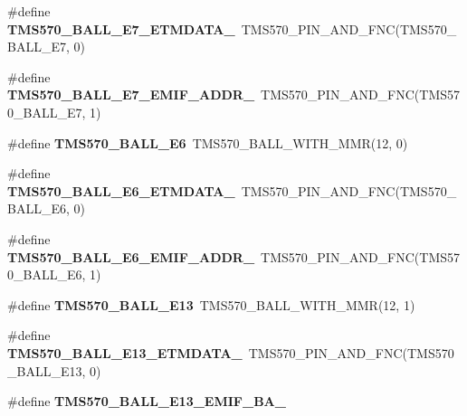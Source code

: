 \begin{DoxyCompactItemize}
\#define {\bfseries T\+M\+S570\+\_\+\+B\+A\+L\+L\+\_\+\+E7\+\_\+\+E\+T\+M\+D\+A\+T\+A\+\_}~T\+M\+S570\+\_\+\+P\+I\+N\+\_\+\+A\+N\+D\+\_\+\+F\+NC(T\+M\+S570\+\_\+\+B\+A\+L\+L\+\_\+\+E7, 0)
\item 
\mbox{\label{tms570lc4357-pins_8h_abb9cbc6f03a0fc7743dd2a638ba13be2}} 
\#define {\bfseries T\+M\+S570\+\_\+\+B\+A\+L\+L\+\_\+\+E7\+\_\+\+E\+M\+I\+F\+\_\+\+A\+D\+D\+R\+\_}~T\+M\+S570\+\_\+\+P\+I\+N\+\_\+\+A\+N\+D\+\_\+\+F\+NC(T\+M\+S570\+\_\+\+B\+A\+L\+L\+\_\+\+E7, 1)
\item 
\mbox{\label{tms570lc4357-pins_8h_a7cf07c9a9e890c88405df04b6ee9b4ca}} 
\#define {\bfseries T\+M\+S570\+\_\+\+B\+A\+L\+L\+\_\+\+E6}~T\+M\+S570\+\_\+\+B\+A\+L\+L\+\_\+\+W\+I\+T\+H\+\_\+\+M\+MR(12, 0)
\item 
\mbox{\label{tms570lc4357-pins_8h_a5279aa45bd5c7bd31db6da14a9242fad}} 
\#define {\bfseries T\+M\+S570\+\_\+\+B\+A\+L\+L\+\_\+\+E6\+\_\+\+E\+T\+M\+D\+A\+T\+A\+\_}~T\+M\+S570\+\_\+\+P\+I\+N\+\_\+\+A\+N\+D\+\_\+\+F\+NC(T\+M\+S570\+\_\+\+B\+A\+L\+L\+\_\+\+E6, 0)
\item 
\mbox{\label{tms570lc4357-pins_8h_af934c5439596ef453592ff9815aa296b}} 
\#define {\bfseries T\+M\+S570\+\_\+\+B\+A\+L\+L\+\_\+\+E6\+\_\+\+E\+M\+I\+F\+\_\+\+A\+D\+D\+R\+\_}~T\+M\+S570\+\_\+\+P\+I\+N\+\_\+\+A\+N\+D\+\_\+\+F\+NC(T\+M\+S570\+\_\+\+B\+A\+L\+L\+\_\+\+E6, 1)
\item 
\mbox{\label{tms570lc4357-pins_8h_a582eb1953422f5281124524910be26e7}} 
\#define {\bfseries T\+M\+S570\+\_\+\+B\+A\+L\+L\+\_\+\+E13}~T\+M\+S570\+\_\+\+B\+A\+L\+L\+\_\+\+W\+I\+T\+H\+\_\+\+M\+MR(12, 1)
\item 
\mbox{\label{tms570lc4357-pins_8h_a35750f29473cc9d99d5b71d0d3e79c9e}} 
\#define {\bfseries T\+M\+S570\+\_\+\+B\+A\+L\+L\+\_\+\+E13\+\_\+\+E\+T\+M\+D\+A\+T\+A\+\_}~T\+M\+S570\+\_\+\+P\+I\+N\+\_\+\+A\+N\+D\+\_\+\+F\+NC(T\+M\+S570\+\_\+\+B\+A\+L\+L\+\_\+\+E13, 0)
\item 
\#define {\bfseries T\+M\+S570\+\_\+\+B\+A\+L\+L\+\_\+\+E13\+\_\+\+E\+M\+I\+F\+\_\+\+B\+A\+\_}
\item 
\mbox{\label{tms570lc4357-pins_8h_a2cbc26ce5776a9c6e096314662c6d759}} 

\end{DoxyCompactItemize}
